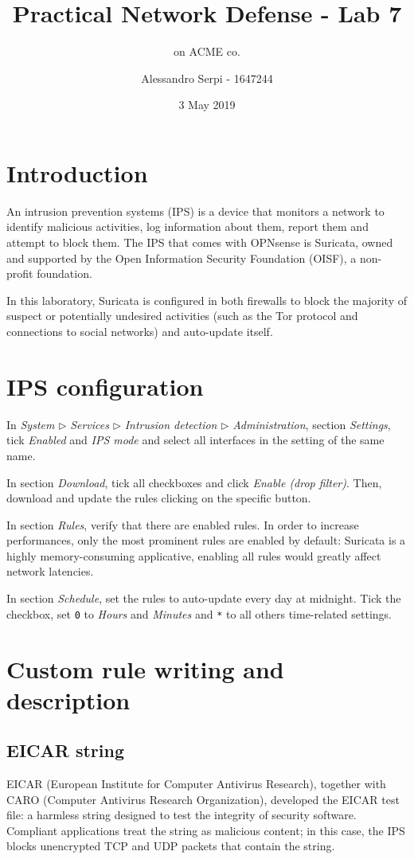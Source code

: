 \documentclass{homework}
\title{Practical Network Defense - Lab 7}
\subtitle{\suri on ACME co.}
\author{Alessandro Serpi - 1647244}
\date{3 May 2019}
\newcommand{\opn}{OPNsense\xspace}
\newcommand{\suri}{Suricata\xspace}
\begin{document}
    \maketitle
    \tableofcontents
    
    
    \pagebreak
    \section{Introduction}
    An intrusion prevention systems (IPS) is a device that monitors a network to identify malicious activities, log information about them, report them and attempt to block them.
    The IPS that comes with \opn is \suri, owned and supported by the Open Information Security Foundation (OISF), a non-profit foundation.
    
    In this laboratory, \suri is configured in both firewalls to block the majority of suspect or potentially undesired activities (such as the Tor protocol and connections to social networks) and auto-update itself.
    
    
    \section{IPS configuration}
    In \textit{System} $\triangleright$ \textit{Services} $\triangleright$ \textit{Intrusion detection} $\triangleright$ \textit{Administration}, section \textit{Settings}, tick \textit{Enabled} and \textit{IPS mode} and select all interfaces in the setting of the same name.
    
    In section \textit{Download}, tick all checkboxes and click \textit{Enable (drop filter)}. Then, download and update the rules clicking on the specific button.
    
    In section \textit{Rules}, verify that there are enabled rules.
    In order to increase performances, only the most prominent rules are enabled by default: \suri is a highly memory-consuming applicative, enabling all rules would greatly affect network latencies.
    
    In section \textit{Schedule}, set the rules to auto-update every day at midnight.
    Tick the checkbox, set \texttt{0} to \textit{Hours} and \textit{Minutes} and \texttt{*} to all others time-related settings.
    
    
    \section{Custom rule writing and description}
    \subsection{EICAR string}
    EICAR (European Institute for Computer Antivirus Research), together with CARO (Computer Antivirus Research Organization), developed the EICAR test file: a harmless string designed to test the integrity of security software.
    Compliant applications treat the string as malicious content; in this case, the IPS blocks unencrypted TCP and UDP packets that contain the string.
    
\end{document}
